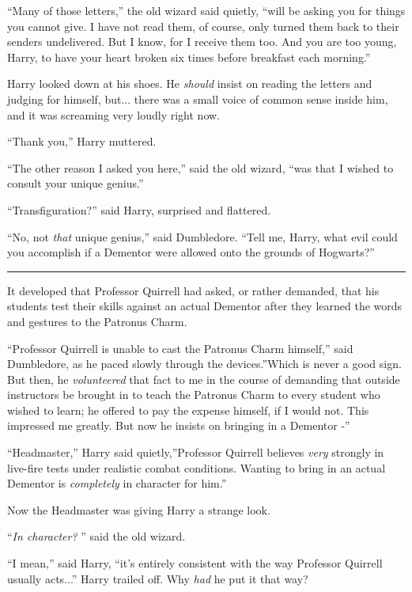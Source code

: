 ``Many of those letters,'' the old wizard said quietly, ``will be asking
you for things you cannot give. I have not read them, of course, only
turned them back to their senders undelivered. But I know, for I receive
them too. And you are too young, Harry, to have your heart broken six
times before breakfast each morning.''

Harry looked down at his shoes. He \emph{should} insist on reading the
letters and judging for himself, but... there was a small voice of
common sense inside him, and it was screaming very loudly right now.

``Thank you,'' Harry muttered.

``The other reason I asked you here,'' said the old wizard, ``was that I
wished to consult your unique genius.''

``Transfiguration?'' said Harry, surprised and flattered.

``No, not \emph{that} unique genius,'' said Dumbledore. ``Tell me, Harry,
what evil could you accomplish if a Dementor were allowed onto the
grounds of Hogwarts?''

\begin{center}\rule{3in}{0.4pt}\end{center}

It developed that Professor Quirrell had asked, or rather demanded, that
his students test their skills against an actual Dementor after they
learned the words and gestures to the Patronus Charm.

``Professor Quirrell is unable to cast the Patronus Charm himself,''
said Dumbledore, as he paced slowly through the devices.''Which is never
a good sign. But then, he \emph{volunteered} that fact to me in the
course of demanding that outside instructors be brought in to teach the
Patronus Charm to every student who wished to learn; he offered to pay
the expense himself, if I would not. This impressed me greatly. But now
he insists on bringing in a Dementor -''

``Headmaster,'' Harry said quietly,''Professor Quirrell believes
\emph{very} strongly in live-fire tests under realistic combat
conditions. Wanting to bring in an actual Dementor is \emph{completely}
in character for him.''

Now the Headmaster was giving Harry a strange look.

``\emph{In character?} '' said the old wizard.

``I mean,'' said Harry, ``it's entirely consistent with the way
Professor Quirrell usually acts...'' Harry trailed off. Why
\emph{had} he put it that way?

